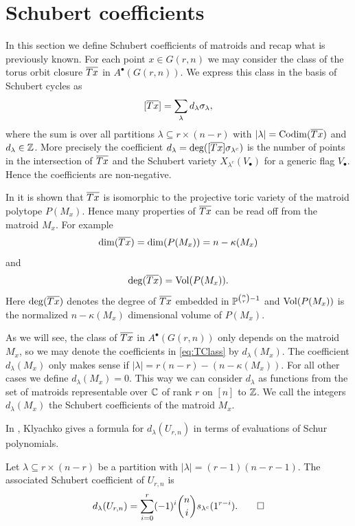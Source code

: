 \section{Schubert coefficients}

In this section we define Schubert coefficients of matroids and recap what is previously known. For each point $x\in G(r,n)$ we may consider the class of the torus orbit closure ${\overline{Tx}}$ in $A^\bullet(G(r,n))$. We express this class in the basis of Schubert cycles as
\begin{equation}
    \label{eq:TClass}
    [{\overline{Tx}}] = \sum_{\lambda} d_\lambda \sigma_\lambda,
\end{equation}
where the sum is over all partitions $\lambda \subseteq r\times(n-r)$ with $|\lambda| = \operatorname{\mathrm{Codim}}({\overline{Tx}})$ and $d_\lambda \in {\mathbb Z}$. More precisely the coefficient $d_\lambda = \deg([{\overline{Tx}}] \sigma_{\lambda^c})$ is the number of points in the intersection of ${\overline{Tx}}$ and the Schubert variety $X_{\lambda^c}(V_\bullet)$ for a generic flag $V_\bullet$. Hence the coefficients are non-negative.

In \cite{Gel} it is shown that ${\overline{Tx}}$ is isomorphic to the projective toric variety of the matroid polytope $P(M_x)$. Hence many properties of ${\overline{Tx}}$ can be read off from the matroid $M_x$. For example
\begin{equation}
    \dim({\overline{Tx}}) = \dim(P(M_x)) = n - \kappa(M_x)
\end{equation}
and
\begin{equation}
    \deg({\overline{Tx}}) = \operatorname{\mathrm{Vol}}(P(M_x)).
\end{equation}
Here $\deg({\overline{Tx}})$ denotes the degree of ${\overline{Tx}}$ embedded in ${\mathbb P}^{\binom{n}{r}-1}$ and $\operatorname{\mathrm{Vol}}(P(M_x))$ is the normalized $n-\kappa(M_x)$ dimensional volume of $P(M_x)$.

As we will see, the class of ${\overline{Tx}}$ in $A^\bullet(G(r,n))$ only depends on the matroid $M_x$, so we may denote the coefficients in \cref{eq:TClass} by $d_\lambda(M_x)$. The coefficient $d_\lambda(M_x)$ only makes sense if $|\lambda| = r(n-r)-(n-\kappa(M_x))$. For all other cases we define $d_\lambda(M_x) = 0$. This way we can consider $d_\lambda$ as functions from the set of matroids representable over ${\mathbb C}$ of rank $r$ on $[n]$ to ${\mathbb Z}$. We call the integers $d_\lambda(M_x)$ the Schubert coefficients of the matroid $M_x$.

In \cite{Klyachko}, Klyachko gives a formula for $d_\lambda(U_{r,n})$ in terms of evaluations of Schur polynomials.

\begin{thm}\textnormal{\cite[Theorem 6]{Klyachko}}
    \label{thm:Klyachko}
    Let $\lambda \subseteq r \times (n-r)$ be a partition with $|\lambda| = (r-1)(n-r-1)$. The associated Schubert coefficient of $U_{r,n}$ is
    \begin{equation*}
        d_\lambda(U_{r,n}) = \sum_{i=0}^r (-1)^i\binom{n}{i}s_{\lambda^c}(1^{r-i}).
        \qedhere
    \end{equation*}
\end{thm}

